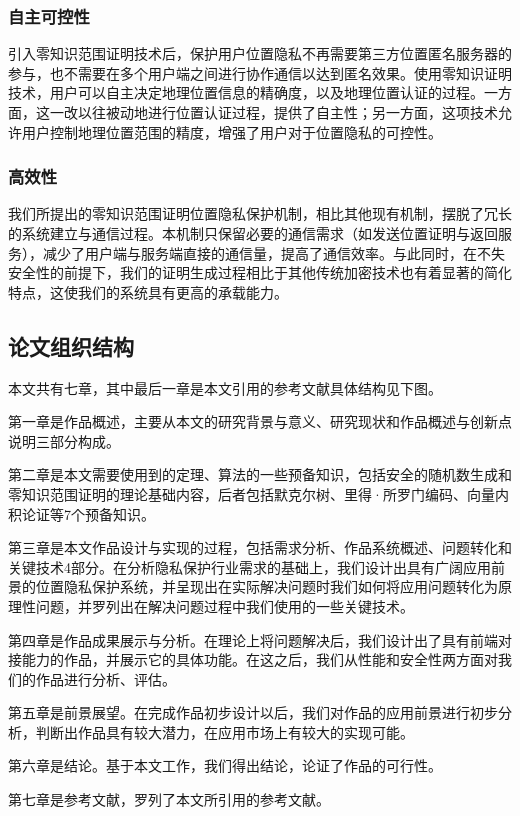 \documentclass[zihao=-4]{ctexart}
\begin{document}
\subsubsection{自主可控性}
引入零知识范围证明技术后，保护用户位置隐私不再需要第三方位置匿名服务器的参与，也不需要在多个用户端之间进行协作通信以达到匿名效果。使用零知识证明技术，用户可以自主决定地理位置信息的精确度，以及地理位置认证的过程。一方面，这一改以往被动地进行位置认证过程，提供了自主性；另一方面，这项技术允许用户控制地理位置范围的精度，增强了用户对于位置隐私的可控性。

\subsubsection{高效性}
我们所提出的零知识范围证明位置隐私保护机制，相比其他现有机制，摆脱了冗长的系统建立与通信过程。本机制只保留必要的通信需求（如发送位置证明与返回服务），减少了用户端与服务端直接的通信量，提高了通信效率。与此同时，在不失安全性的前提下，我们的证明生成过程相比于其他传统加密技术也有着显著的简化特点，这使我们的系统具有更高的承载能力。

\subsection{论文组织结构}
本文共有七章，其中最后一章是本文引用的参考文献具体结构见下图。
\par 
第一章是作品概述，主要从本文的研究背景与意义、研究现状和作品概述与创新点说明三部分构成。
\par 
第二章是本文需要使用到的定理、算法的一些预备知识，包括安全的随机数生成和零知识范围证明的理论基础内容，后者包括默克尔树、里得·所罗门编码、向量内积论证等7个预备知识。
\par 
第三章是本文作品设计与实现的过程，包括需求分析、作品系统概述、问题转化和关键技术4部分。在分析隐私保护行业需求的基础上，我们设计出具有广阔应用前景的位置隐私保护系统，并呈现出在实际解决问题时我们如何将应用问题转化为原理性问题，并罗列出在解决问题过程中我们使用的一些关键技术。
\par 
第四章是作品成果展示与分析。在理论上将问题解决后，我们设计出了具有前端对接能力的作品，并展示它的具体功能。在这之后，我们从性能和安全性两方面对我们的作品进行分析、评估。
\par 
第五章是前景展望。在完成作品初步设计以后，我们对作品的应用前景进行初步分析，判断出作品具有较大潜力，在应用市场上有较大的实现可能。
\par 
第六章是结论。基于本文工作，我们得出结论，论证了作品的可行性。
\par 
第七章是参考文献，罗列了本文所引用的参考文献。
\end{document}

